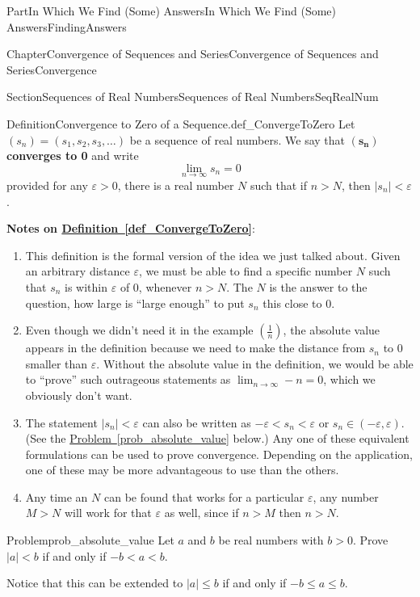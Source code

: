 \documentclass[oneside,10pt,]{book}
\newcommand{\xreffont}{\relax}
\newcommand{\terminology}[1]{\textbf{#1}}
\numberwithin{equation}{part}
\newcommand{\abs}[1]{\left|#1\right|}
\def\limit#1#2#3{{\displaystyle\lim_{#1\rightarrow #2}#3}}
\def\limitt#1#2#3{{\displaystyle\lim_{#1\rightarrow #2}\textstyle #3}}
\newcommand{\eps}{\varepsilon}
\newcommand{\lt}{<}
\begin{document}
\begin{partptx}{Part}{In Which We Find (Some) Answers}{}{In Which We Find (Some) Answers}{}{}{FindingAnswers}
\begin{chapterptx}{Chapter}{Convergence of Sequences and Series}{}{Convergence of Sequences and Series}{}{}{Convergence}
\begin{sectionptx}{Section}{Sequences of Real Numbers}{}{Sequences of Real Numbers}{}{}{SeqRealNum}
\begin{definition}{Definition}{Convergence to Zero of a Sequence.}{def_ConvergeToZero}
 Let \(\left(s_n\right)=\left(s_1,s_2,s_3,\ldots\right)\) be a sequence of real numbers.  We say that \(\left(\boldsymbol{s}_{\boldsymbol{n}}\right)\) \terminology{converges to 0} and write%
\begin{equation*}
\limit{n}{\infty}{s_n}=0
\end{equation*}
provided for any \(\eps>0\), there is a real number \(N\) such that if \(n>N\), then \(|s_n|\lt \eps\).%
\end{definition}
\terminology{Notes on \hyperref[def_ConvergeToZero]{Definition~{\xreffont\ref{def_ConvergeToZero}}}}:%
\begin{enumerate}
\item{}This definition is the formal version of the idea we just talked about. Given an arbitrary distance \(\eps\), we must be able to find a specific number \(N\) such that \(s_n\) is within \(\eps\) of \(0\), whenever \(n>N\).  The \(N\) is the answer to the question, how large is ``large enough'' to put \(s_n\) this close to \(0\).%
\item{}Even though we didn't need it in the example \(\left(\frac{1}{n}\right)\), the absolute value appears in the definition because we need to make the distance from \(s_n\) to 0 smaller than \(\eps\).  Without the absolute value in the definition, we would be able to ``prove'' such outrageous statements as \(\limitt{n}{\infty}{-n}=0\), which we obviously don't want.%
\item{}The statement \(|s_n|\lt \eps\) can also be written as \(-\eps\lt s_n\lt \eps\) or \(s_n\in\left(-\eps,\eps\right)\). (See the \hyperref[prob_absolute_value]{Problem~{\xreffont\ref{prob_absolute_value}}} below.) Any one of these equivalent formulations can be used to prove convergence. Depending on the application, one of these may be more advantageous to use than the others.%
\item{}Any time an \(N\) can be found that works for a particular \(\eps\), any number \(M>N\) will work for that \(\eps\) as well, since if \(n>M\) then \(n>N\).%
\end{enumerate}
%
\begin{problem}{Problem}{}{prob_absolute_value}%
Let \(a\) and \(b\) be real numbers with \(b>0\). Prove \(|a|\lt b\) if and only if \(-b\lt a\lt b\).%
\par
Notice that this can be extended to \(\abs{a}\leq b\) if and only if \(-b\leq a\leq b\).%
\end{problem}

\end{sectionptx}
\end{chapterptx}
\end{partptx}
\end{document}
